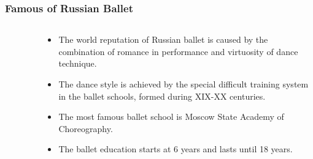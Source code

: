 \documentclass[pdflatex,compress,8pt,
	xcolor={dvipsnames,dvipsnames,svgnames,x11names,table},
	hyperref={colorlinks = true,breaklinks = true, urlcolor = NavyBlue, breaklinks = true}]{beamer}
\begin{document}
\begin{frame}\frametitle{Famous of Russian Ballet}
\begin{minipage}[0.4\textheight]{\textwidth}
\begin{columns}[T]
\begin{column}{0.4\textwidth}
\begin{figure}[H]
	\centering
			\vspace{3mm}
\end{figure}
\end{column}
\begin{column}{0.6\textwidth}
\vspace{2em} 
\begin{itemize}
	\item The world reputation of Russian ballet is caused by the combination of romance in performance and virtuosity of dance technique. 
	\item The dance style is achieved by the special difficult training system in the ballet schools, formed during XIX-XX centuries.
	\item The most famous ballet school is Moscow State Academy of Choreography.
	\item The ballet education starts at 6 years and lasts until 18 years.
\end{itemize}
\end{column}
\end{columns}
\end{minipage}
\end{frame}
\end{document}
